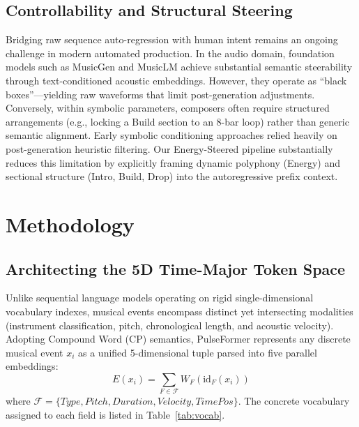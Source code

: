 \documentclass[conference]{IEEEtran}
\begin{document}
\subsection{Controllability and Structural Steering}
Bridging raw sequence auto-regression with human intent remains an ongoing challenge in modern automated production. In the audio domain, foundation models such as MusicGen \cite{copet2023simple} and MusicLM \cite{agostinelli2023musiclm} achieve substantial semantic steerability through text-conditioned acoustic embeddings. However, they operate as ``black boxes''---yielding raw waveforms that limit post-generation adjustments. Conversely, within symbolic parameters, composers often require structured arrangements (e.g., locking a Build section to an 8-bar loop) rather than generic semantic alignment. Early symbolic conditioning approaches relied heavily on post-generation heuristic filtering. Our Energy-Steered pipeline substantially reduces this limitation by explicitly framing dynamic polyphony (Energy) and sectional structure (Intro, Build, Drop) into the autoregressive prefix context.

\section{Methodology}
\label{sec:methodology}


\subsection{Architecting the 5D Time-Major Token Space}
Unlike sequential language models operating on rigid single-dimensional vocabulary indexes, musical events encompass distinct yet intersecting modalities (instrument classification, pitch, chronological length, and acoustic velocity). Adopting Compound Word (CP) \cite{hsiao2021compound} semantics, PulseFormer represents any discrete musical event $x_i$ as a unified 5-dimensional tuple parsed into five parallel embeddings:
\begin{equation} \label{eq:embedding}
E(x_i) = \sum_{F \in \mathcal{F}} W_F(\text{id}_F(x_i))
\end{equation}
where $\mathcal{F} = \{Type, Pitch, Duration, Velocity, TimePos\}$.
The concrete vocabulary assigned to each field is listed in Table~\ref{tab:vocab}.
\end{document}
